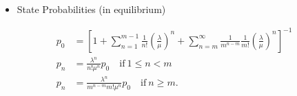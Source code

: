 \documentclass[11pt]{article}
\providecommand{\tightlist}{%
      \setlength{\itemsep}{0pt}\setlength{\parskip}{0pt}}
\begin{document}
    \begin{center}
    \end{center}
    { \hspace*{\fill} \\}
    
    \begin{itemize}
\tightlist
\item
  State Probabilities (in equilibrium)
\end{itemize}

\begin{align} 
            p_0 &= \left[ 1 + \sum_{n=1}^{m-1} \frac{1}{n!} \left( \frac{\lambda}{\mu} \right)^n + \sum_{n=m}^{\infty} \frac{1}{m^{n-m}} \frac{1}{m!} \left( \frac{\lambda}{\mu} \right)^n \right]^{-1}\\
            p_n &= \frac{\lambda^n}{n! \mu^n} p_0 \quad \text{if} \ 1 \leq n < m\\
            p_n &= \frac{\lambda^n}{m^{n-m} m! \mu^n} p_0 \quad \text{if} \ n \geq m.
\end{align}
\end{document}
